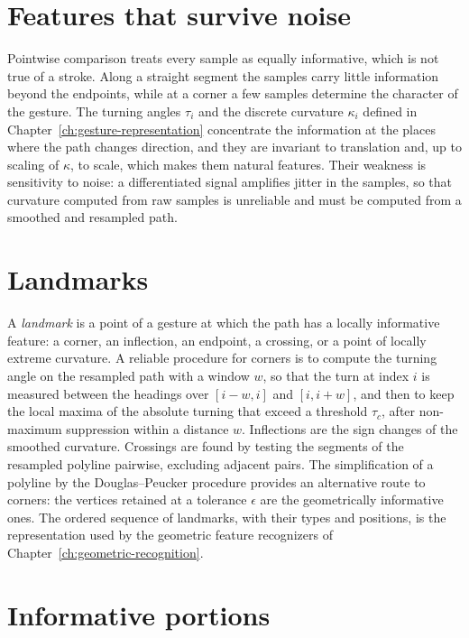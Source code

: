 \section{Features that survive noise}

Pointwise comparison treats every sample as equally informative, which is not true of a stroke. Along a straight segment the samples carry little information beyond the endpoints, while at a corner a few samples determine the character of the gesture. The turning angles $\tau_i$ and the discrete curvature $\kappa_i$ defined in Chapter~\ref{ch:gesture-representation} concentrate the information at the places where the path changes direction, and they are invariant to translation and, up to scaling of $\kappa$, to scale, which makes them natural features. Their weakness is sensitivity to noise: a differentiated signal amplifies jitter in the samples, so that curvature computed from raw samples is unreliable and must be computed from a smoothed and resampled path.

\section{Landmarks}

A \emph{landmark} is a point of a gesture at which the path has a locally informative feature: a corner, an inflection, an endpoint, a crossing, or a point of locally extreme curvature. A reliable procedure for corners is to compute the turning angle on the resampled path with a window $w$, so that the turn at index $i$ is measured between the headings over $[i-w,i]$ and $[i,i+w]$, and then to keep the local maxima of the absolute turning that exceed a threshold $\tau_c$, after non-maximum suppression within a distance $w$. Inflections are the sign changes of the smoothed curvature. Crossings are found by testing the segments of the resampled polyline pairwise, excluding adjacent pairs. The simplification of a polyline by the Douglas--Peucker procedure \cite{douglas1973}\evD{} provides an alternative route to corners: the vertices retained at a tolerance $\epsilon$ are the geometrically informative ones. The ordered sequence of landmarks, with their types and positions, is the representation used by the geometric feature recognizers of Chapter~\ref{ch:geometric-recognition}.

\section{Informative portions}

